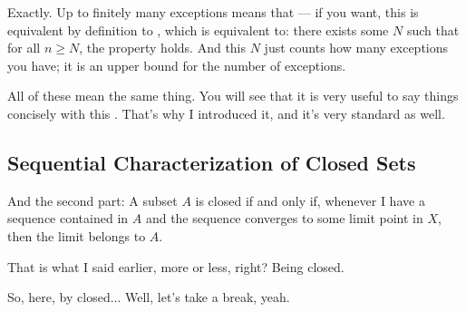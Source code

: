 \begin{speech}[00:40:08 - 00:40:54]
Exactly. Up to finitely many exceptions means that --- if you want, this is equivalent by definition to , which is equivalent to:  there exists some $N$ such that for all $n \ge N$, the property holds. And this $N$ just counts how many exceptions you have; it is an upper bound for the number of exceptions.

All of these mean the same thing. You will see that it is very useful to say things concisely with this . That's why I introduced it, and it's very standard as well.
\end{speech}

\begin{content}
\end{content}

\subsection{Sequential Characterization of Closed Sets}

\begin{speech}[00:40:54 - 00:42:14]
And the second part:  A subset $A$ is closed if and only if, whenever I have a sequence contained in $A$ and the sequence converges to some limit point in $X$, then the limit belongs to $A$.

That is what I said earlier, more or less, right? Being closed.

So, here, by closed...  Well, let's take a break, yeah.
\end{speech}

